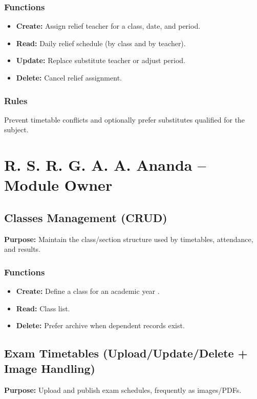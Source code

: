 \documentclass[12pt,a4paper]{article}
\begin{document}
\subsubsection*{Functions}
\begin{itemize}[leftmargin=*]
  \item \textbf{Create:} Assign relief teacher for a class, date, and period.
  \item \textbf{Read:} Daily relief schedule (by class and by teacher).
  \item \textbf{Update:} Replace substitute teacher or adjust period.
  \item \textbf{Delete:} Cancel relief assignment.
\end{itemize}

\subsubsection*{Rules}
Prevent timetable conflicts and optionally prefer substitutes qualified for the subject.

\section{R. S. R. G. A. A. Ananda -- Module Owner}

\subsection{Classes Management (CRUD)}
\textbf{Purpose:} Maintain the class/section structure used by timetables, attendance, and results.

\subsubsection*{Functions}
\begin{itemize}[leftmargin=*]
  \item \textbf{Create:} Define a class for an academic year .
  \item \textbf{Read:} Class list.
  \item \textbf{Delete:} Prefer archive when dependent records exist.
\end{itemize}

\subsection{Exam Timetables (Upload/Update/Delete + Image Handling)}
\textbf{Purpose:} Upload and publish exam schedules, frequently as images/PDFs.
\end{document}
